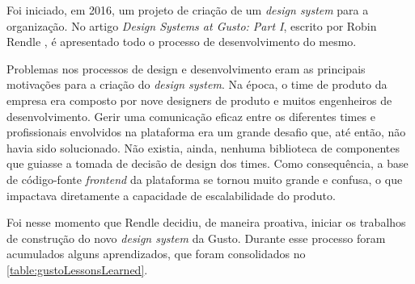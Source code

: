 Foi iniciado, em 2016, um projeto de criação de um \textit{design system} para a organização. No artigo \textit{Design Systems at Gusto: Part I}, escrito por Robin Rendle \cite{gustoDesignSystem}, é apresentado todo o processo de desenvolvimento do mesmo.

Problemas nos processos de design e desenvolvimento eram as principais motivações para a criação do \textit{design system}. Na época, o time de produto da empresa era composto por nove designers de produto e muitos engenheiros de desenvolvimento. Gerir uma comunicação eficaz entre os diferentes times e profissionais envolvidos na plataforma era um grande desafio que, até então, não havia sido solucionado. Não existia, ainda, nenhuma biblioteca de componentes que guiasse a tomada de decisão de design dos times. Como consequência, a base de código-fonte \textit{frontend} da plataforma se tornou muito grande e confusa, o que impactava diretamente a capacidade de escalabilidade do produto.

Foi nesse momento que Rendle decidiu, de maneira proativa, iniciar os trabalhos de construção do novo \textit{design system} da Gusto. Durante esse processo foram acumulados alguns aprendizados, que foram consolidados no \autoref{table:gustoLessonsLearned}.

